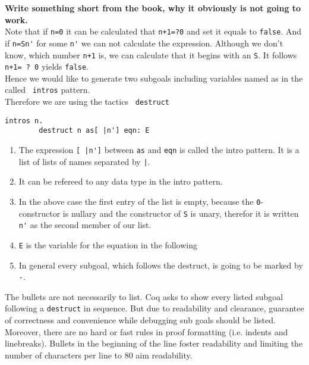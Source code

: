 	   \textbf{ Write something short from the book, why it obviously is not going to work.}\\		
		Note that if \lstinline!n=0! it can be calculated that \lstinline!n+1=?0! and set it equals to  \lstinline!false!. 
		And if \lstinline!n=Sn'! for some \lstinline!n'! we can not calculate the expression.
		Although we don't know, which number \lstinline!n+1! is, we can calculate that it begins with an \lstinline!S!.
		It follows \lstinline!n+1= ? 0! yields \lstinline!false!.\\	
	    Hence we would like to generate two subgoals including variables named as in the called \lstinline! intros! pattern.	 \\        
	    Therefore we are using the tactics \lstinline! destruct!	
		\begin{lstlisting}[caption = \lstinline! destruct!]
		intros n.
		destruct n as[ |n'] eqn: E
		\end{lstlisting}
		
		\begin{enumerate}
			\item The expression \lstinline![ |n']! between \lstinline!as! and \lstinline!eqn! is called the intro pattern. It is a list of lists of names separated by \lstinline!|!.
			\item It can be refereed to any data type in the intro pattern.
			\item In the above case the first entry of the list is empty, because the \lstinline!0!-constructor is nullary and the constructor of \lstinline!S! is unary, therefor it is written \lstinline!n'! as the second member of our list.
			\item \lstinline!E! is the variable for the equation in the following
			\item In general every subgoal, which follows the destruct, is going to be marked by \lstinline!-!.
		\end{enumerate} 
		The bullets are not necessarily to list. 
		Coq asks to show every listed subgoal following a \lstinline!destruct! in sequence.
		But due to readability and clearance, guarantee of correctness and convenience while debugging sub goals should be listed.\\	
		Moreover, there are no hard or fast rules in proof formatting (i.e. indents and linebreaks). 
		Bullets in the beginning of the line foster readability and limiting the number of characters per line to 80 aim readability.
		
